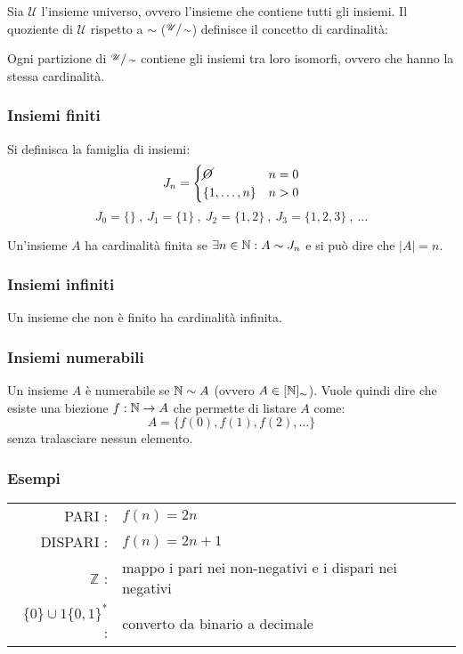 Sia $\mathcal{U}$ l'insieme universo, ovvero l'insieme che contiene tutti gli insiemi.
Il quoziente di $\mathcal{U}$ rispetto a $\sim$ ($\sfrac{\mathcal{U}}{\sim}$) definisce il 
concetto di cardinalità:

\begin{figure}[H]
    \centering
    
\end{figure}

Ogni partizione di $\sfrac{\mathcal{U}}{\sim}$ contiene gli insiemi tra loro isomorfi, ovvero
che hanno la stessa cardinalità.

\subsubsection*{Insiemi finiti}
Si definisca la famiglia di insiemi: 
$$J_n=\begin{cases}
\cancel{O} & n=0\\
\{1,\dots ,n\} & n>0
\end{cases}$$
$$ J_0=\{\}\ , \ J_1=\{1\} \ , \ J_{2}=\{1,2\} \ , \ J_{3}=\{1,2,3\}\ , \ \dots $$

Un'insieme $A$ ha cardinalità finita se $\exists n\in\mathbb{N} : A\sim J_n$ e si può dire che
$|A|=n$.

\subsubsection*{Insiemi infiniti}
Un insieme che non è finito ha cardinalità infinita.

\subsubsection{Insiemi numerabili}
Un insieme $A$ è numerabile se $\mathbb{N}\sim A$ (ovvero $A\in [\mathbb{N}]_\sim$). Vuole quindi dire
che esiste una biezione $f:\mathbb{N}\rightarrow A$ che permette di listare $A$ come:
$$ A = \{f(0),f(1),f(2),\dots\} $$
senza tralasciare nessun elemento.
\subsubsection*{Esempi}
\begin{tabular}{r l}
    PARI :& $f(n)=2n$ \\
    DISPARI :& $f(n)=2n+1$ \\
    $\mathbb{Z}$ :& mappo i pari nei non-negativi e i dispari nei negativi \\
    $\{0\}\cup 1\{0,1\}^*$ :& converto da binario a decimale \\
\end{tabular}

